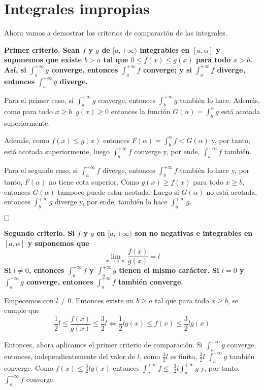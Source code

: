 \documentclass[a4paper]{article}
\newcommand{\qed}{\begin{flushright}
		{$\newline\square$}
	\end{flushright}}
\begin{document}
\section{Integrales impropias}

Ahora vamos a demostrar los criterios de comparación de las integrales.

\textbf{Primer criterio. Sean $f$ y $g$ de $[a, +\infty)$ integrables en $[a,\alpha]$ y suponemos que existe $b>a$ tal que $0\le f(x)\le g(x)$ para todo $x>b$. Así, si $\int_a^{+\infty}g$ converge, entonces $\int_a^{+\infty}f$ converge; y si $\int_a^{+\infty}f$ diverge, entonces $\int_a^{+\infty}g$ diverge.}

Para el primer caso, si $\int_a^{+\infty}g$ converge, entonces $\int_b^{+\infty}g$ también lo hace. Además, como para todo $x\ge b \;\; g(x) \ge 0$ entonces la función $G(\alpha) = \int^\alpha_b g$ está acotada superiormente.

Además, como $f(x) \le g(x)$ entonces $F(\alpha) = \int^\alpha_b f < G(\alpha)$ y, por tanto, está acotada superiormente, luego  $\int_b^{+\infty}f$ converge y, por ende,  $\int_a^{+\infty}f$ también.

Para el segundo caso, si  $\int_a^{+\infty}f$ diverge, entonces  $\int_b^{+\infty}f$ también lo hace y, por tanto, $F(\alpha)$ no tiene cota superior. Como $g(x) \ge f(x)$ para todo $x\ge b$, entonces $G(\alpha)$ tampoco puede estar acotada. Luego si $G(\alpha)$ no está acotada, entonces $\int_b^{+\infty}g$ diverge y, por ende, también lo hace $\int_a^{+\infty}g$.\qed

\textbf{Segundo criterio. Si $f$ y $g$ en $[a,+\infty)$ son no negativas e integrables en $[a,\alpha]$ y suponemos que}
$$\lim_{x\rightarrow +\infty} \frac{f(x)}{g(x)} = l$$
\textbf{Si $l\neq 0$, entonces $\int_a^{+\infty} f$ y  $\int_a^{+\infty} g$ tienen el mismo carácter. Si $l=0$ y  $\int_a^{+\infty} g$ converge, entonces  $\int_a^{+\infty} f$ también converge.}


Empecemos con $l\neq0$. Entonces existe un $b \ge a$ tal que para todo $x\ge b$, se cumple que 
$$\frac{1}{2}l \le \frac{f(x)}{g(x)} \le \frac{3}{2}l \iff \frac{1}{2}l g(x) \le f(x) \le \frac{3}{2}l g(x)$$

Entonces, ahora aplicamos el primer criterio de comparación. Si  $\int_a^{+\infty} g$ converge, entonces, independientemente del valor de $l$, como $\frac{3}{2}l$ es finito, $\frac{3}{2}l$ $\int_a^{+\infty} g$ también converge. Como $f(x) \le\frac{3}{2}l g(x) $ entonces $\int_a^{+\infty} f \le$ $\frac{3}{2}l$$\int_a^{+\infty} g$ y, por tanto, $\int_a^{+\infty} f$ converge.
\end{document}
